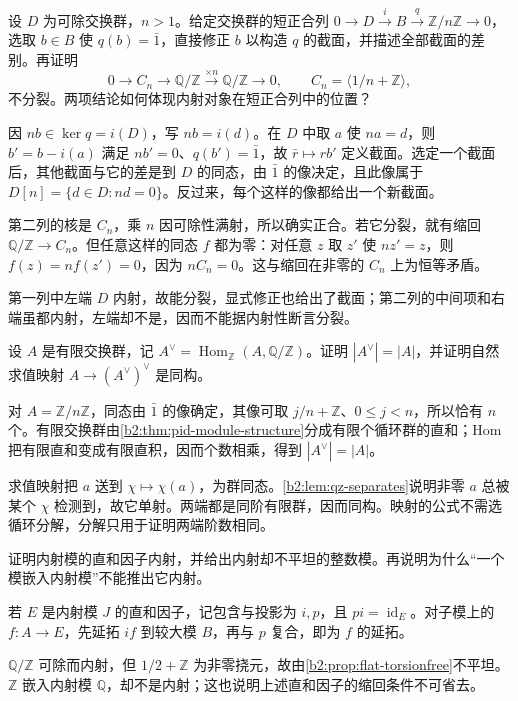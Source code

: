 \begin{exercise}\label{b2:ex:07-divisible-exact-sequence}
	设 \(D\) 为可除交换群，\(n>1\)。给定交换群的短正合列 \(0\to D\xrightarrow{i}B\xrightarrow{q}\mathbb Z/n\mathbb Z\to0\)，选取 \(b\in B\) 使 \(q(b)=\bar1\)，直接修正 \(b\) 以构造 \(q\) 的截面，并描述全部截面的差别。再证明
	\[
		0\longrightarrow C_n\longrightarrow\mathbb Q/\mathbb Z \xrightarrow{\times n}\mathbb Q/\mathbb Z\longrightarrow0, \qquad C_n=\langle1/n+\mathbb Z\rangle,
	\]
	不分裂。两项结论如何体现内射对象在短正合列中的位置？
\end{exercise}
\begin{solution}
	因 \(nb\in\ker q=i(D)\)，写 \(nb=i(d)\)。在 \(D\) 中取 \(a\) 使 \(na=d\)，则 \(b'=b-i(a)\) 满足 \(nb'=0\)、\(q(b')=\bar1\)，故 \(\bar r\mapsto rb'\) 定义截面。选定一个截面后，其他截面与它的差是到 \(D\) 的同态，由 \(\bar1\) 的像决定，且此像属于 \(D[n]=\{d\in D:nd=0\}\)。反过来，每个这样的像都给出一个新截面。

	第二列的核是 \(C_n\)，乘 \(n\) 因可除性满射，所以确实正合。若它分裂，就有缩回 \(\mathbb Q/\mathbb Z\to C_n\)。但任意这样的同态 \(f\) 都为零：对任意 \(z\) 取 \(z'\) 使 \(nz'=z\)，则 \(f(z)=nf(z')=0\)，因为 \(nC_n=0\)。这与缩回在非零的 \(C_n\) 上为恒等矛盾。

	第一列中左端 \(D\) 内射，故能分裂，显式修正也给出了截面；第二列的中间项和右端虽都内射，左端却不是，因而不能据内射性断言分裂。
\end{solution}

\begin{exercise}\label{b2:ex:07-finite-characters}
	设 \(A\) 是有限交换群，记 \(A^\vee=\operatorname{Hom}_{\mathbb Z}(A,\mathbb Q/\mathbb Z)\)。证明 \(|A^\vee|=|A|\)，并证明自然求值映射 \(A\to(A^\vee)^\vee\) 是同构。
\end{exercise}
\begin{solution}
	对 \(A=\mathbb Z/n\mathbb Z\)，同态由 \(\bar1\) 的像确定，其像可取 \(j/n+\mathbb Z\)、\(0\le j<n\)，所以恰有 \(n\) 个。有限交换群由\cref{b2:thm:pid-module-structure}分成有限个循环群的直和；Hom 把有限直和变成有限直积，因而个数相乘，得到 \(|A^\vee|=|A|\)。

	求值映射把 \(a\) 送到 \(\chi\mapsto\chi(a)\)，为群同态。\cref{b2:lem:qz-separates}说明非零 \(a\) 总被某个 \(\chi\) 检测到，故它单射。两端都是同阶有限群，因而同构。映射的公式不需选循环分解，分解只用于证明两端阶数相同。
\end{solution}

\begin{exercise}\label{b2:ex:07-injective-summands}
	证明内射模的直和因子内射，并给出内射却不平坦的整数模。再说明为什么“一个模嵌入内射模”不能推出它内射。
\end{exercise}
\begin{solution}
	若 \(E\) 是内射模 \(J\) 的直和因子，记包含与投影为 \(i,p\)，且 \(pi=\operatorname{id}_E\)。对子模上的 \(f:A\to E\)，先延拓 \(if\) 到较大模 \(B\)，再与 \(p\) 复合，即为 \(f\) 的延拓。

	\(\mathbb Q/\mathbb Z\) 可除而内射，但 \(1/2+\mathbb Z\) 为非零挠元，故由\cref{b2:prop:flat-torsionfree}不平坦。\(\mathbb Z\) 嵌入内射模 \(\mathbb Q\)，却不是内射；这也说明上述直和因子的缩回条件不可省去。
\end{solution}

